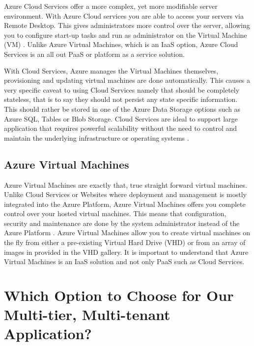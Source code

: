 Azure Cloud Services offer a more complex, yet more modifiable server environment. With Azure Cloud services you are able to access your servers via Remote Desktop. This gives administrators more control over the server, allowing you to configure start-up tasks and run as administrator on the Virtual Machine (VM) \cite{Microsoft_Corporation2014-gg}. Unlike Azure Virtual Machines, which is an IaaS option, Azure Cloud Services is an all out PaaS  or platform as a service solution.
 
With Cloud Services, Azure manages the Virtual Machines themselves, provisioning and updating virtual machines are done automatically. This causes a very specific caveat to using Cloud Services namely that should be completely stateless, that is to say they should not persist any state specific information. This should rather be stored in one of the Azure Data Storage options such as Azure SQL, Tables or Blob Storage. Cloud Services are ideal to support large application that requires powerful scalability without the need to control and maintain the underlying infrastructure or operating systems \cite{Microsoft_Corporation_undated-ej}.

\subsection{Azure Virtual Machines}

Azure Virtual Machines are exactly that, true straight forward virtual machines. Unlike Cloud Services or Websites where deployment and management is mostly integrated into the Azure Platform, Azure Virtual Machines offers you complete control over your hosted virtual machines. This means that configuration, security and maintenance are done by the system administrator instead of the Azure Platform \cite{Microsoft_Corporation2014-gg}. Azure Virtual Machines allow you to create virtual machines on the fly from either a pre-existing Virtual Hard Drive (VHD) or from an array of images in provided in the VHD gallery. It is important to understand that Azure Virtual Machines is an IaaS solution and not only PaaS such as Cloud Services.

\section{Which Option to Choose for Our Multi-tier, Multi-tenant Application?}

